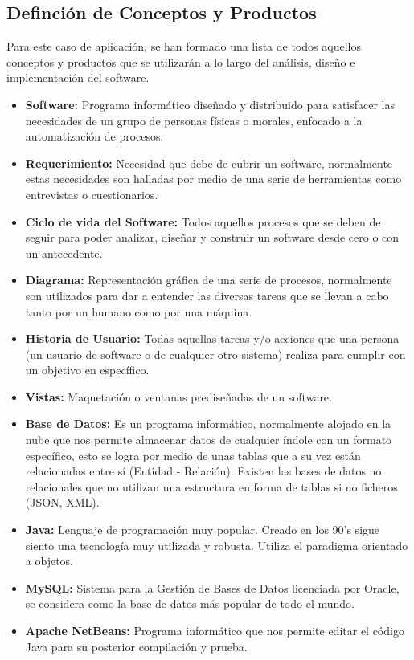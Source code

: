 \subsection{Definción de Conceptos y Productos}
Para este caso de aplicación, se han formado una lista de todos aquellos conceptos y productos que se utilizarán a lo largo del análisis, diseño e implementación del software.
\begin{itemize}
	\item \textbf{Software:} Programa informático diseñado y distribuido para satisfacer las necesidades de un grupo de personas físicas o morales, enfocado a la automatización de procesos.
	\item \textbf{Requerimiento:} Necesidad que debe de cubrir un software, normalmente estas necesidades son halladas por medio de una serie de herramientas como entrevistas o cuestionarios.
	\item \textbf{Ciclo de vida del Software:} Todos aquellos procesos que se deben de seguir para poder analizar, diseñar y construir un software desde cero o con un antecedente.
	\item \textbf{Diagrama:} Representación gráfica de una serie de procesos, normalmente son utilizados para dar a entender las diversas tareas que se llevan a cabo tanto por un humano como por una máquina.
	\item \textbf{Historia de Usuario:} Todas aquellas tareas y/o acciones que una persona (un usuario de software o de cualquier otro sistema) realiza para cumplir con un objetivo en específico. 
	\item \textbf{Vistas:} Maquetación o ventanas prediseñadas de un software.
	\item \textbf{Base de Datos:} Es un programa informático, normalmente alojado en la nube que nos permite almacenar datos de cualquier índole con un formato específico, esto se logra por medio de unas tablas que a su vez están relacionadas entre sí (Entidad - Relación). Existen las bases de datos no relacionales que no utilizan una estructura en forma de tablas si no ficheros (JSON, XML). 
	\item \textbf{Java: } Lenguaje de programación muy popular. Creado en los 90's sigue siento una tecnología muy utilizada y robusta. Utiliza el paradigma orientado a objetos. 
	\item \textbf{MySQL:} Sistema para la Gestión de Bases de Datos licenciada por Oracle, se considera como la base de datos más popular de todo el mundo.
	\item \textbf{Apache NetBeans: } Programa informático que nos permite editar el código Java para su posterior compilación y prueba.

\end{itemize}
